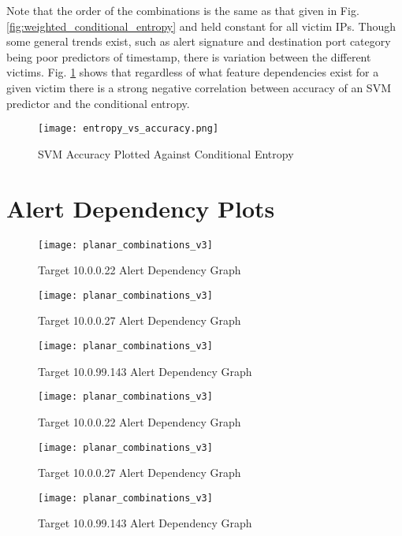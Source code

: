\begin{appendices}
	Note that the order of the combinations is the same as that given in Fig. \ref{fig:weighted_conditional_entropy} and held constant for all victim IPs. Though some general trends exist, such as alert signature and destination port category being poor predictors of timestamp, there is variation between the different victims. Fig. \ref{fig:entropy_v_accuracy} shows that regardless of what feature dependencies exist for a given victim there is a strong negative correlation between accuracy of an SVM predictor and the conditional entropy.
	
	\begin{figure}[!htbp]
		\centering
		\texttt{[image: entropy\_vs\_accuracy.png]}
		\caption{SVM Accuracy Plotted Against Conditional Entropy}
		\label{fig:entropy_v_accuracy}
	\end{figure}
	
	
	\chapter{Alert Dependency Plots}
	\label{sec:depend_app}
	
	\begin{figure}[!htbp]
		\centering
		\texttt{[image: planar\_combinations\_v3]}
		\caption{
			Target 10.0.0.22 Alert Dependency Graph
		}
		\label{fig:alert_depend_2}
	\end{figure}
	
	\begin{figure}[!htbp]
		\centering
		\texttt{[image: planar\_combinations\_v3]}
		\caption{
			Target 10.0.0.27 Alert Dependency Graph
		}
		\label{fig:alert_depend_3}
	\end{figure}
	
	\begin{figure}[!htbp]
		\centering
		\texttt{[image: planar\_combinations\_v3]}
		\caption{
			Target 10.0.99.143 Alert Dependency Graph 
		}
		\label{fig:alert_depend_4}
	\end{figure}

	\begin{figure}[!htbp]
		\centering
		\texttt{[image: planar\_combinations\_v3]}
		\caption{
			Target 10.0.0.22 Alert Dependency Graph
		}
		\label{fig:alert_depend_6}
	\end{figure}
	
	\begin{figure}[!htbp]
		\centering
		\texttt{[image: planar\_combinations\_v3]}
		\caption{
			Target 10.0.0.27 Alert Dependency Graph
		}
		\label{fig:alert_depend_7}
	\end{figure}
	
	\begin{figure}[!htbp]
		\centering
		\texttt{[image: planar\_combinations\_v3]}
		\caption{
			Target 10.0.99.143 Alert Dependency Graph 
		}
		\label{fig:alert_depend_8}
	\end{figure}

\end{appendices}